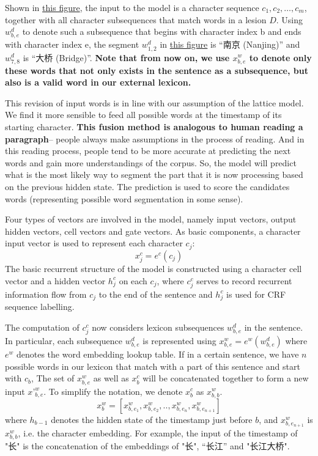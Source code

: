 \documentclass[letterpaper]{article} %
\begin{document}
Shown in \hyperref[fig:our]{this figure}, the input to the model is a character sequence $c_1, c_2,…, c_m$, together with all character subsequences that match words in a lesion $D$. Using $w_{b,e}^d$ to denote such a subsequence that begins with character index b and ends with character index e, the segment $w_{1,2}^d$ in \hyperref[fig:our]{this figure} is “南京 (Nanjing)” and $w_{7,8}^d$ is “大桥 (Bridge)”. \textbf{Note that from now on, we use $x_{b,e}^{w}$ to denote only these words that not only exists in the sentence as a subsequence, but also is a valid word in our external lexicon.}

This revision of input words is in line with our assumption of the lattice model. We find it more sensible to feed all possible words at the timestamp of its starting character. \textbf{This fusion method is analogous to human reading a paragraph}-- people always make assumptions in the process of reading. And in this reading process, people tend to be more accurate at predicting the next words and gain more understandings of the corpus. So, the model will predict what is the most likely way to segment the part that it is now processing based on the previous hidden state. The prediction is used to score the candidates words (representing possible word segmentation in some sense).


Four types of vectors are involved in the model, namely input vectors, output hidden vectors, cell vectors and gate vectors. As basic components, a character input vector is used to represent each character $c_j$:
\begin{equation}
    x_j^c=e^c(c_j)
\end{equation}
The basic recurrent structure of the model is constructed using a character cell vector and a hidden vector $h_j^c$ on each $c_j$, where $c_j^c$ serves to record recurrent information flow from $c_j$ to the end of the sentence and $h_j^c$ is used for CRF sequence labelling.

The computation of $c_j^c$ now considers lexicon subsequences $w_{b,e}^d$ in the sentence. In particular, each subsequence $w_{b,e}^d$ is represented using
$x_{b,e}^w=e^w(w_{b,e}^d)$
where $e^w$ denotes the word embedding lookup table.
If in a certain sentence, we have $n$ possible words in our lexicon that match with a part of this sentence and start with $c_{b}$, The set of $x_{b,e}^w$ as well as $x_b^c$ will be concatenated together to form a new input $x’_{b,e}^w$. To simplify the notation, we denote $x_{b}^c$ as $x_{b,b}^w$.
\begin{equation}
    x_{b}^w = [x_{b,e_{1}}^w,x_{b,e_{2}}^w,..,x_{b,e_{n}}^w,x_{b,e_{n+1}}^w]
\end{equation}
where $h_{b-1}$ denotes the hidden state of the timestamp just before $b$, and $x_{b,e_{n+1}}^w$ is $x_{b,b}^w$, i.e. the character embedding. For example, the input of the timestamp of "长" is the concatenation of the embeddings of "长", “长江” and "长江大桥".
\end{document}
